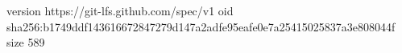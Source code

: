 version https://git-lfs.github.com/spec/v1
oid sha256:b1749ddf143616672847279d147a2adfe95eafe0e7a25415025837a3e808044f
size 589

